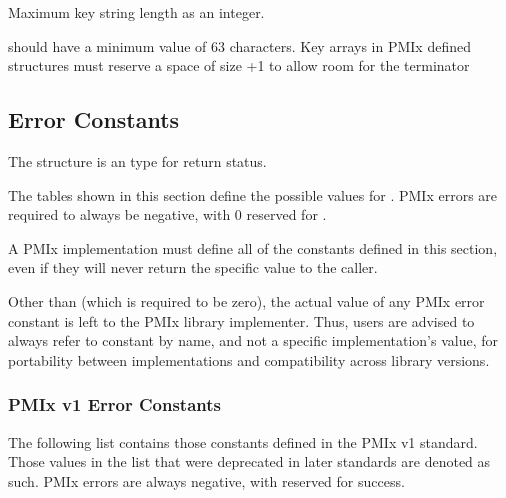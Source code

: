 \begin{constantdesc}
%
Maximum key string length as an integer.
%
\end{constantdesc}

\adviceimplstart
{} should have a minimum value of 63 characters. Key arrays in \ac{PMIx} defined structures must reserve
a space of size +1 to allow room for the  terminator
\adviceimplend


\subsection{Error Constants}
\label{api:struct:errors}

The  structure is an  type for return status.

The tables shown in this section define the possible values for .
PMIx errors are required to always be negative, with 0 reserved for .

A PMIx implementation must define all of the constants defined in this section, even if they will never return the specific value to the caller.

\adviceuserstart
Other than  (which is required to be zero), the actual value of any \ac{PMIx} error constant is left to the \ac{PMIx} library implementer. Thus, users are advised to always refer to constant by name, and not a specific implementation's value, for portability between implementations and compatibility across library versions.
\adviceuserend

\subsubsection{PMIx v1 Error Constants}

The following list contains those constants defined in the PMIx v1 standard.
Those values in the list that were deprecated in later standards are denoted as such.
\ac{PMIx} errors are always negative, with  reserved for success.

